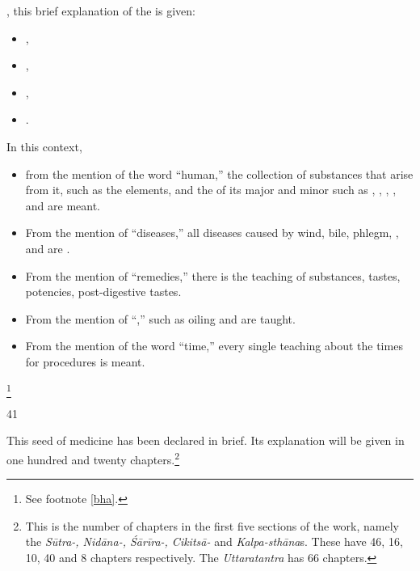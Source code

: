 \begin{translation}
    , this brief explanation of the 
    is given: \begin{itemize}
        \item    
        ,
        \item
        ,
        \item
        ,
        \item
        .
    \end{itemize}
    In this context, 
    \begin{itemize}
        \item from the mention of the word “human,” the collection of 
        substances that arise from it, such as the elements, and the 
         of its major 
        and minor  such as 
        , 
        , 
        , 
        , 
         and 
        are meant.
        \item
        From the mention of “diseases,” all diseases 
        caused by
        wind, bile, phlegm,
        ,
         and 
         are .
        \item
        From the mention of “remedies,”
        there is the teaching of 
        substances,
        tastes, 
        potencies,
        post-digestive tastes.
        \item
        From the mention of 
        “,”
         such as oiling
        and 
         are taught.
        \item
        From the mention of the word “time,” every single teaching about the times for
        procedures is meant. 
        
    \end{itemize}
    \footnote{See footnote \ref{bha}.}
    
    \item[41]
    
    \begin{sloka}
        This seed of medicine has been declared in brief.  Its explanation will be given in one 
        hundred and twenty chapters.\footnote{This is the number of chapters in the first 
        five sections of the work, namely the  \emph{Sūtra-, Nidāna-, Śārīra-, Cikitsā-} 
        and \emph{Kalpa-sthāna}s. These have 46, 16, 10, 40 and 8 chapters respectively.  The 
        \emph{Uttaratantra} has 66 chapters.}
\end{sloka}


\end{translation}

